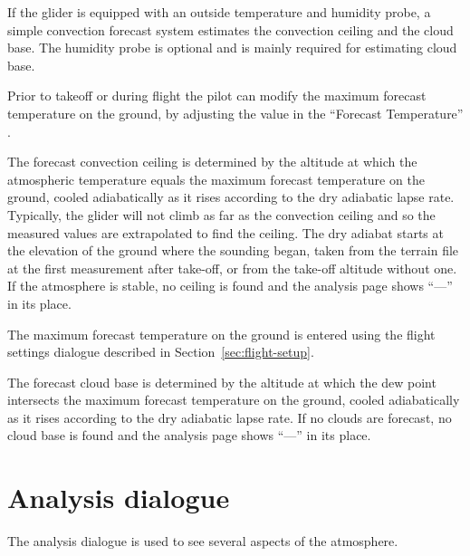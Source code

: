 If the glider is equipped with an outside temperature and humidity
probe, a simple convection forecast system estimates the convection
ceiling and the cloud base.  The humidity probe is optional and is
mainly required for estimating cloud base.

Prior to takeoff or during flight the pilot can modify the maximum
forecast temperature on the ground, by adjusting the value in the
``Forecast Temperature'' {\InfoBox}.

The forecast convection ceiling is determined by the altitude at which
the atmospheric temperature equals the maximum forecast temperature on
the ground, cooled adiabatically as it rises according to the dry
adiabatic lapse rate.  Typically, the glider will not climb as far as
the convection ceiling and so the measured values are extrapolated to
find the ceiling.  The dry adiabat starts at the elevation of the
ground where the sounding began, taken from the terrain file at the
first measurement after take-off, or from the take-off altitude
without one.  If the atmosphere is stable, no ceiling is found and the
analysis page shows ``---'' in its place.

The maximum forecast temperature on the ground is entered using the
flight settings dialogue described in Section~\ref{sec:flight-setup}.


%

The forecast cloud base is determined by the altitude at which the dew
point intersects the maximum forecast temperature on the ground,
cooled adiabatically as it rises according to the dry adiabatic lapse
rate.  If no clouds are forecast, no cloud base is found and the
analysis page shows ``---'' in its place.


\section{Analysis dialogue}

The analysis dialogue is used to see several aspects of the atmosphere.

